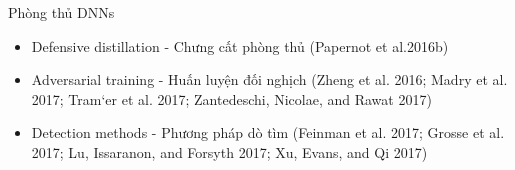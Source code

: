 \begin{frame}{Phòng thủ DNNs}
    \begin{itemize}
        \item Defensive distillation - Chưng cất phòng thủ (Papernot et al.2016b)
        \item Adversarial training - Huấn luyện đối nghịch (Zheng et al. 2016; Madry et al. 2017; 
        Tram`er et al. 2017; Zantedeschi, Nicolae, and Rawat 2017)
        \item Detection methods - Phương pháp dò tìm (Feinman et al. 2017; Grosse et al. 2017; Lu, Issaranon, and Forsyth 2017; 
        Xu, Evans, and Qi 2017)
    \end{itemize}
\end{frame}